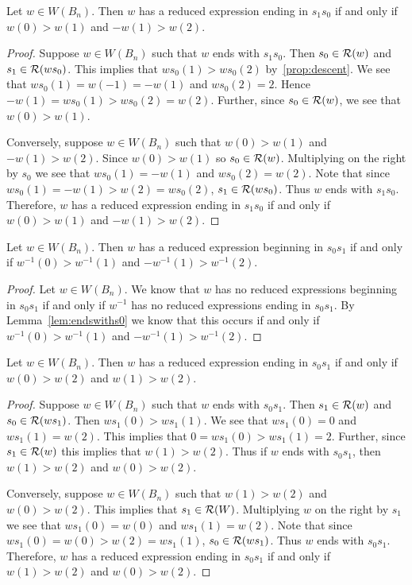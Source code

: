 \begin{lemma}\label{lem:endswiths0}
Let $w \in W(B_n)$. Then $w$ has a reduced expression ending in $s_1s_0$ if and only if $w(0)>w(1)$ and $-w(1)>w(2)$.
\begin{proof}
	Suppose $w \in W(B_n)$ such that $w$ ends with $s_1s_0$. Then $s_0 \in \mathcal{R}(w)$ and $s_1 \in \mathcal{R}(ws_0)$. This implies that $ws_0(1)>ws_0(2)$ by~\ref{prop:descent}. We see that $ws_0(1)=w(-1)=-w(1)$ and $ws_0(2)=2$. Hence $-w(1)=ws_0(1)>ws_0(2)=w(2)$. Further, since $s_0 \in \mathcal{R}(w)$, we see that $w(0)>w(1)$.
	
	Conversely, suppose $w \in W(B_n)$ such that $w(0)>w(1)$ and $-w(1)>w(2)$. Since $w(0)>w(1)$ so $s_0 \in \mathcal{R}(w)$. Multiplying on the right by $s_0$ we see that $ws_0(1)=-w(1)$ and $ws_0(2)=w(2)$. Note that since $ws_0(1)=-w(1)>w(2)=ws_0(2)$, $s_1 \in \mathcal{R}(ws_0)$. Thus $w$ ends with $s_1s_0$. Therefore, $w$ has a reduced expression ending in $s_1s_0$ if and only if $w(0)>w(1)$ and $-w(1)>w(2)$.
\end{proof}
\end{lemma}

\begin{corollary}\label{lem:beginswiths0}
	Let $w \in W(B_n)$. Then $w$ has a reduced expression beginning in $s_0s_1$ if and only if $w^{-1}(0)>w^{-1}(1)$ and $-w^{-1}(1)>w^{-1}(2)$.
	\begin{proof}
		Let $w \in W(B_n)$. We know that $w$ has no reduced expressions beginning in $s_0s_1$ if and only if $w^{-1}$ has no reduced expressions ending in $s_0s_1$. By Lemma~\ref{lem:endswiths0} we know that this occurs if and only if $w^{-1}(0)>w^{-1}(1)$ and $-w^{-1}(1)>w^{-1}(2)$.
	\end{proof}
\end{corollary}

\begin{lemma}\label{lem:endswiths_1}
Let $w \in W(B_n)$. Then $w$ has a reduced expression ending in $s_0s_1$ if and only if $w(0)>w(2)$ and $w(1)>w(2)$.
\begin{proof}
	Suppose $w \in W(B_n)$ such that $w$ ends with $s_0s_1$. Then $s_1 \in \mathcal{R}(w)$ and $s_0 \in \mathcal{R}(ws_1)$. Then $ws_1(0)>ws_1(1)$. We see that $ws_1(0)=0$ and $ws_1(1)=w(2)$. This implies that $0=ws_1(0)>ws_1(1)=2$. Further, since $s_1 \in \mathcal{R}(w)$ this implies that $w(1) > w(2)$. Thus if $w$ ends with $s_0s_1$, then $w(1)>w(2)$ and $w(0)>w(2)$.
	
	Conversely, suppose $w \in W(B_n)$ such that $w(1)>w(2)$ and $w(0)>w(2)$. This implies that $s_1 \in \mathcal{R}(W)$. Multiplying $w$ on the right by $s_1$ we see that $ws_1(0)=w(0)$ and $ws_1(1)=w(2)$. Note that since $ws_1(0)=w(0)>w(2)=ws_1(1)$, $s_0 \in \mathcal{R}(ws_1)$. Thus $w$ ends with $s_0s_1$. Therefore, $w$ has a reduced expression ending in $s_0s_1$ if and only if $w(1)>w(2)$ and $w(0)>w(2)$.
\end{proof}	
\end{lemma}

